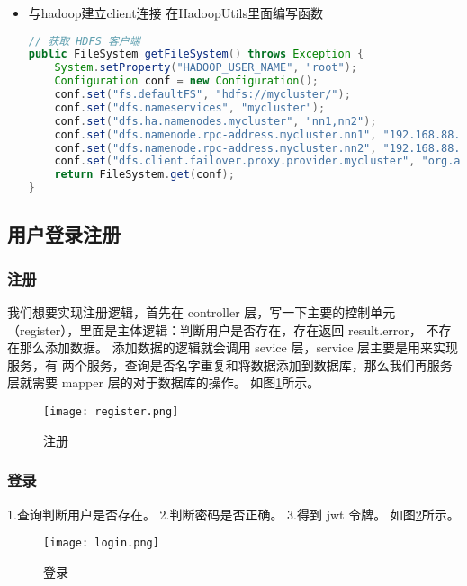 \documentclass[bachelor]{thesis-uestc}
\begin{document}
\begin{itemize}
\item 与hadoop建立client连接
在HadoopUtils里面编写函数
\begin{lstlisting}[language=Java]
// 获取 HDFS 客户端
public FileSystem getFileSystem() throws Exception {
    System.setProperty("HADOOP_USER_NAME", "root");
    Configuration conf = new Configuration();
    conf.set("fs.defaultFS", "hdfs://mycluster/");
    conf.set("dfs.nameservices", "mycluster");
    conf.set("dfs.ha.namenodes.mycluster", "nn1,nn2");
    conf.set("dfs.namenode.rpc-address.mycluster.nn1", "192.168.88.151:8020");
    conf.set("dfs.namenode.rpc-address.mycluster.nn2", "192.168.88.152:8020");
    conf.set("dfs.client.failover.proxy.provider.mycluster", "org.apache.hadoop.hdfs.server.namenode.ha.ConfiguredFailoverProxyProvider");
    return FileSystem.get(conf);
}

\end{lstlisting}
\end{itemize}

\subsection{用户登录注册}
\subsubsection{注册}

我们想要实现注册逻辑，首先在 controller 层，写一下主要的控制单元
（register），里面是主体逻辑：判断用户是否存在，存在返回 result.error，
不存在那么添加数据。
添加数据的逻辑就会调用 sevice 层，service 层主要是用来实现服务，有
两个服务，查询是否名字重复和将数据添加到数据库，那么我们再服务
层就需要 mapper 层的对于数据库的操作。
如图\ref{re}所示。
\begin{figure}[htbp]
    \centering
    \texttt{[image: register.png]}
    \caption{注册}
    \label{re}
\end{figure}


\subsubsection{登录}
1.查询判断用户是否存在。
2.判断密码是否正确。
3.得到 jwt 令牌。
如图\ref{lo}所示。
\begin{figure}[htbp]
    \centering
    \texttt{[image: login.png]}
    \caption{登录}
    \label{lo}
\end{figure}
\end{document}
